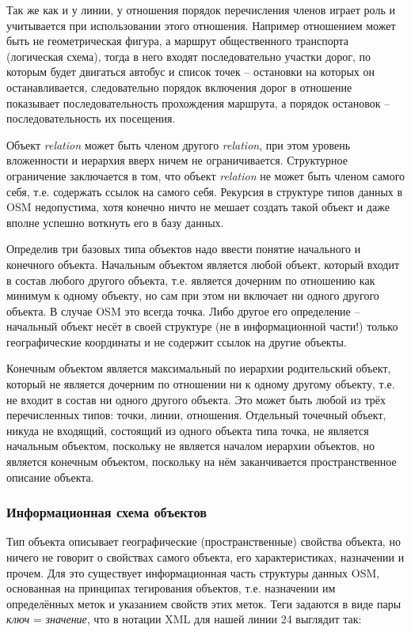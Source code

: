 Так же как и у линии, у отношения порядок перечисления членов играет роль и 
учитывается при использовании этого отношения. Например отношением может быть 
не геометрическая фигура, а маршрут общественного транспорта (логическая 
схема), тогда в него входят последовательно участки дорог, по которым будет 
двигаться автобус и список точек -- остановки на которых он останавливается, 
следовательно порядок включения дорог в отношение показывает последовательность 
прохождения маршрута, а порядок остановок -- последовательность их посещения.

Объект \emph{relation} может быть членом другого \emph{relation}, при этом 
уровень вложенности и иерархия вверх ничем не ограничивается. Структурное 
ограничение заключается в том, что объект \emph{relation} не может быть членом 
самого себя, т.е. содержать ссылок на самого себя. Рекурсия в структуре типов 
данных в OSM недопустима, хотя конечно ничто не мешает создать такой объект 
и даже вполне успешно воткнуть его в базу данных.

Определив три базовых типа объектов надо ввести понятие начального и конечного 
объекта. Начальным объектом является любой объект, который входит в состав 
любого другого объекта, т.е. является дочерним по отношению как минимум к 
одному объекту, но сам при этом ни включает ни одного другого объекта. В 
случае OSM это всегда точка. Либо другое его определение -- начальный объект 
несёт в своей структуре (не в информационной части!) только географические 
координаты и не содержит ссылок на другие объекты.

Конечным объектом является максимальный по иерархии родительский объект, 
который не является дочерним по отношении ни к одному другому объекту, т.е. не 
входит в состав ни одного другого объекта. Это может быть любой из трёх 
перечисленных типов: точки, линии, отношения. Отдельный точечный объект, 
никуда не входящий, состоящий из одного объекта типа точка, не является 
начальным объектом, поскольку не является началом иерархии объектов, но 
является конечным объектом, поскольку на нём заканчивается пространственное 
описание объекта.\cite{habrahabr02}

\subsubsection{Информационная схема объектов}
Тип объекта описывает географические (пространственные) свойства объекта, но 
ничего не говорит о свойствах самого объекта, его характеристиках, назначении 
и прочем. Для это существует информационная часть структуры данных OSM, 
основанная на принципах тегирования объектов, т.е. назначении им определённых 
меток и указанием свойств этих меток. Теги задаются в виде пары 
\emph{ключ} = \emph{значение}, что в нотации XML для нашей линии 24 выглядит 
так:

